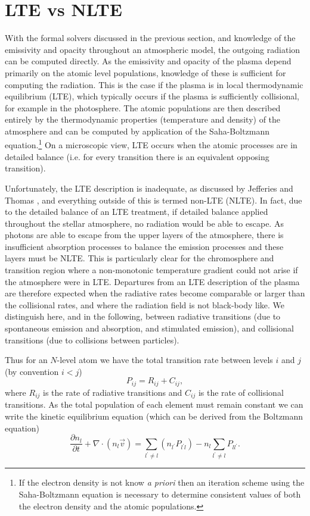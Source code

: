 \section{LTE vs NLTE}

With the formal solvers discussed in the previous section, and knowledge of the emissivity and opacity throughout an atmospheric model, the outgoing radiation can be computed directly. As the emissivity and opacity of the plasma depend primarily on the atomic level populations, knowledge of these is sufficient for computing the radiation.
This is the case if the plasma is in local thermodynamic equilibrium (LTE), which typically occurs if the plasma is sufficiently collisional, for example in the photosphere. The atomic populations are then described entirely by the thermodynamic properties (temperature and density) of the atmosphere and can be computed by application of the Saha-Boltzmann equation.\footnote{If the electron density is not know \textit{a priori} then an iteration scheme using the Saha-Boltzmann equation is necessary to determine consistent values of both the electron density and the atomic populations.} On a microscopic view, LTE occurs when the atomic processes are in detailed balance (i.e. for every transition there is an equivalent opposing transition).

Unfortunately, the LTE description is inadequate, as discussed by Jefferies and Thomas \NeedRef{}, and everything outside of this is termed non-LTE (NLTE). In fact, due to the detailed balance of an LTE treatment, if detailed balance applied throughout the stellar atmosphere, no radiation would be able to escape. As photons are able to escape from the upper layers of the atmosphere, there is insufficient absorption processes to balance the emission processes and these layers must be NLTE. This is particularly clear for the chromosphere and transition region where a non-monotonic temperature gradient could not arise if the atmosphere were in LTE.
Departures from an LTE description of the plasma are therefore expected when the radiative rates become comparable or larger than the collisional rates, and where the radiation field is not black-body like.
We distinguish here, and in the following, between radiative transitions (due to spontaneous emission and absorption, and stimulated emission), and collisional transitions (due to collisions between particles).

Thus for an $N$-level atom we have the total transition rate between levels $i$ and $j$ (by convention $i < j$)
\begin{equation}
    P_{ij} = R_{ij} + C_{ij},
\end{equation}
where $R_{ij}$ is the rate of radiative transitions and $C_{ij}$ is the rate of collisional transitions.
As the total population of each element must remain constant we can write the kinetic equilibrium equation (which can be derived from the Boltzmann equation)
\begin{equation}
    \frac{\partial n_l}{\partial t} + \nabla \cdot (n_l \vec{v}) = \sum_{l^\prime\neq l} (n_{l^\prime} P_{l^\prime l}) - n_l \sum_{l^\prime\neq l} P_{ll^\prime}.
    \label{Eq:KinEq}
\end{equation}

